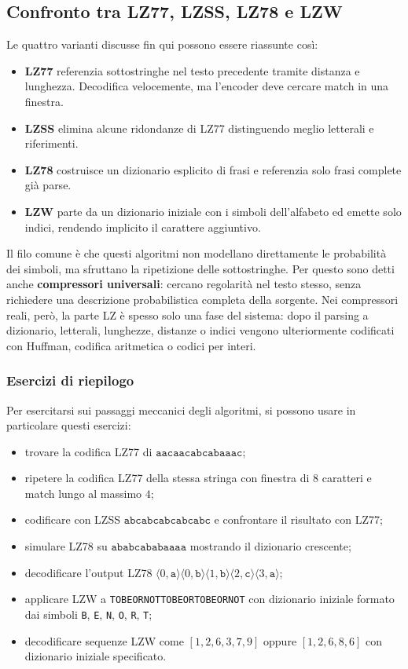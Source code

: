 \documentclass{article}
\theoremstyle{definition}
\numberwithin{equation}{section}
\begin{document}
\subsection{Confronto tra LZ77, LZSS, LZ78 e LZW}
Le quattro varianti discusse fin qui possono essere riassunte così:
\begin{itemize}
    \item \textbf{LZ77} referenzia sottostringhe nel testo precedente tramite distanza e lunghezza. Decodifica velocemente, ma l'encoder deve cercare match in una finestra.
    \item \textbf{LZSS} elimina alcune ridondanze di LZ77 distinguendo meglio letterali e riferimenti.
    \item \textbf{LZ78} costruisce un dizionario esplicito di frasi e referenzia solo frasi complete già parse.
    \item \textbf{LZW} parte da un dizionario iniziale con i simboli dell'alfabeto ed emette solo indici, rendendo implicito il carattere aggiuntivo.
\end{itemize}

Il filo comune è che questi algoritmi non modellano direttamente le probabilità dei simboli, ma sfruttano la ripetizione delle sottostringhe. Per questo sono detti anche \textbf{compressori universali}: cercano regolarità nel testo stesso, senza richiedere una descrizione probabilistica completa della sorgente. Nei compressori reali, però, la parte LZ è spesso solo una fase del sistema: dopo il parsing a dizionario, letterali, lunghezze, distanze o indici vengono ulteriormente codificati con Huffman, codifica aritmetica o codici per interi.

\subsubsection{Esercizi di riepilogo}
Per esercitarsi sui passaggi meccanici degli algoritmi, si possono usare in particolare questi esercizi:
\begin{itemize}
    \item trovare la codifica LZ77 di $\texttt{aacaacabcabaaac}$;
    \item ripetere la codifica LZ77 della stessa stringa con finestra di $8$ caratteri e match lungo al massimo $4$;
    \item codificare con LZSS $\texttt{abcabcabcabcabc}$ e confrontare il risultato con LZ77;
    \item simulare LZ78 su $\texttt{ababcababaaaa}$ mostrando il dizionario crescente;
    \item decodificare l'output LZ78
          $\langle 0,\texttt{a}\rangle
              \langle 0,\texttt{b}\rangle
              \langle 1,\texttt{b}\rangle
              \langle 2,\texttt{c}\rangle
              \langle 3,\texttt{a}\rangle$;
    \item applicare LZW a \texttt{TOBEORNOTTOBEORTOBEORNOT} con dizionario iniziale formato dai simboli \texttt{B}, \texttt{E}, \texttt{N}, \texttt{O}, \texttt{R}, \texttt{T};
    \item decodificare sequenze LZW come $[1,2,6,3,7,9]$ oppure $[1,2,6,8,6]$ con dizionario iniziale specificato.
\end{itemize}
\end{document}
